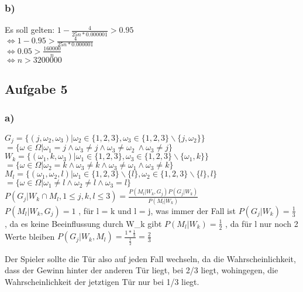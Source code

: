 \documentclass[11pt]{amsart}
\begin{document}
\subsubsection*{b)}

Es soll gelten: $1 - \frac{4}{25n * 0.000001} > 0.95$ \\
$\Leftrightarrow 1-0.95 > \frac{4}{25n * 0.000001}$ \\
$\Leftrightarrow 0.05 > \frac{160000}{n}$ \\
$\Leftrightarrow n > 3 200 000$

\subsection*{Aufgabe 5}

\subsubsection*{a)}

$G_j = \{ (j,\omega_2,\omega_3) | \omega_2 \in \{ 1,2,3 \}, \omega_3 \in \{ 1,2,3 \} \backslash  \{ j , \omega_2 \} \}$ \\
        $= \{ \omega \in \Omega | \omega_1 = j \wedge \omega_3 \not = j \wedge \omega_3 \not = \omega_2\ \wedge \omega_3 \not = j \}$ \\
$W_k = \{ ( \omega_1 , k , \omega_3 ) | \omega_1 \in \{ 1,2,3 \} , \omega_3 \in \{ 1, 2, 3 \} \backslash \{\omega_1 , k \} \}$ \\
     $= \{ \omega \in \Omega | \omega_2 = k \wedge \omega_3 \not = k \wedge \omega_3 \not = \omega_1 \wedge \omega_3 \not = k \}$ \\
$M_l = \{ ( \omega_1 , \omega_2 , l ) | \omega_1 \in \{ 1,2,3 \} \backslash \{ l \} , \omega_2 \in \{ 1, 2, 3 \}  \backslash \{ l \} , l \}$ \\
     $= \{ \omega \in \Omega | \omega_1 \not = l \wedge \omega_2 \not = l \wedge \omega_3 = l \}$ \\

$P(G_j | W_k \cap M_l, 1 \leq j,k,l \leq 3) = \frac{P( M_l | W_k , G_j) P(G_j | W_k)}{P(M_l | W_k)}$ \\
$P(M_l | W_k , G_j ) = 1$ , für l \not = k und l \not = j, was immer der Fall ist
$P(G_j | W_k) = \frac{1}{3}$ , da es keine Beeinflussung durch W_k gibt
$P(M_l | W_k) = \frac{1}{2}$ , da für l nur noch 2 Werte bleiben
$P(G_j | W_k , M_l) = \frac{1 * \frac{1}{3}}{\frac{1}{2}} = \frac{2}{3}$

Der Spieler sollte die Tür also auf jeden Fall wechseln, da die Wahrscheinlichkeit, dass der Gewinn
hinter der anderen Tür liegt, bei 2/3 liegt, wohingegen, die Wahrscheinlichkeit der jetztigen Tür
nur bei 1/3 liegt.
\end{document}
